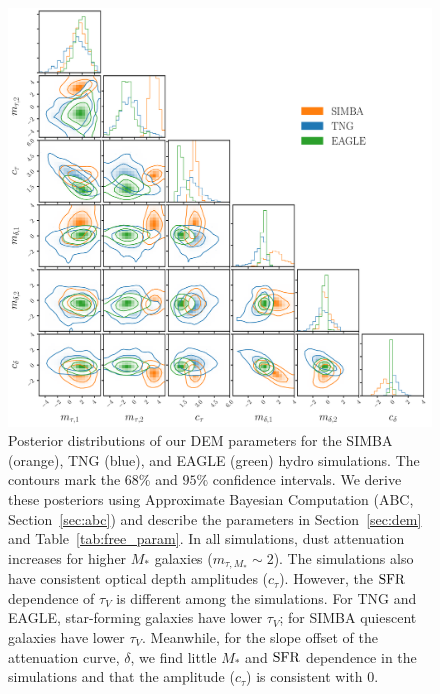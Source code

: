 \begin{figure}
\begin{center}
    \includegraphics[width=\textwidth]{figs/abc.pdf}
    \caption{\label{fig:abc}
    Posterior distributions of our DEM parameters for the SIMBA (orange), TNG
    (blue), and EAGLE (green) hydro simulations. The contours mark the $68\%$
    and $95\%$ confidence intervals. We derive these posteriors using
    Approximate Bayesian Computation (ABC, Section~\ref{sec:abc}) and describe
    the parameters in Section~\ref{sec:dem} and Table~\ref{tab:free_param}. 
    In all simulations, dust attenuation increases for higher $M_*$ galaxies 
    ($m_{\tau,M_*} \sim 2$). The simulations also have consistent optical 
    depth amplitudes ($c_\tau$). However, the ${\rm SFR}$ dependence of
    $\tau_V$ is different among the simulations. For TNG and EAGLE,
    star-forming galaxies have lower $\tau_V$; for SIMBA quiescent galaxies
    have lower $\tau_V$. Meanwhile, for the slope offset of the attenuation
    curve, $\delta$, we find little $M_*$ and ${\rm SFR}$ dependence in the
    simulations and that the amplitude ($c_\tau$) is consistent with 0. 
    }
\end{center}
\end{figure}


